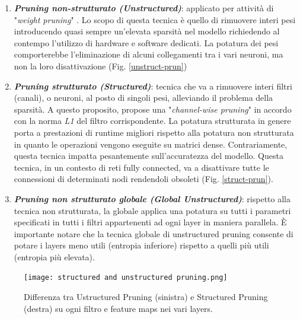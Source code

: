 \begin{enumerate}
    \item {\bfseries{\emph{Pruning non-strutturato (Unstructured)}}}: applicato per attività 
    di "\emph{weight pruning}"\cite{NIPS1989_6c9882bb} \cite{NIPS1992_303ed4c6}. Lo scopo di questa tecnica è quello di 
    rimuovere interi pesi introducendo quasi sempre un'elevata sparsità 
    nel modello richiedendo al contempo l'utilizzo di hardware e software 
    dedicati. La potatura dei pesi comporterebbe l'eliminazione di alcuni 
    collegamenti tra i vari neuroni, ma non la loro disattivazione (Fig. 
    \ref{unstruct-prun})
    \item {\bfseries{\emph{Pruning strutturato (Structured)}}}: tecnica che va a rimuovere interi 
    filtri (canali), o neuroni, al posto di singoli pesi, alleviando il problema 
    della sparsità. A questo proposito, \cite{li2017pruning} propose una "\emph{channel-wise 
    pruning}" in accordo con la norma \emph{L1} del filtro corrispondente. La 
    potatura strutturata in genere porta a prestazioni di runtime migliori 
    rispetto alla potatura non strutturata in quanto le operazioni vengono 
    eseguite su matrici dense. Contrariamente, questa tecnica impatta 
    pesantemente sull'accuratezza del modello. Questa tecnica, in un 
    contesto di reti fully connected, va a disattivare tutte le connessioni 
    di determinati nodi rendendoli obsoleti (Fig. \ref{struct-prun}).
    \item {\bfseries{\emph{Pruning non strutturato globale (Global Unstructured)}}}: rispetto 
    alla tecnica non strutturata, la globale applica una potatura su 
    tutti i parametri specificati in tutti i filtri appartenenti ad ogni layer 
    in maniera parallela. È importante notare che la tecnica globale di 
    unstructured pruning consente di potare i layers meno utili (entropia 
    inferiore) rispetto a quelli più utili (entropia più elevata).
\end{enumerate}

\begin{figure}
    \centering
    \texttt{[image: structured and unstructured pruning.png]}
    \centering
    \caption{Differenza tra Ustructured Pruning (sinistra) e Structured Pruning (destra) su ogni filtro e feature maps nei vari layers.}
    \label{filter-pruning}
\end{figure}

